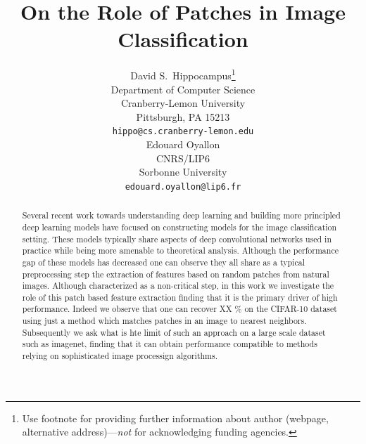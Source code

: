 \documentclass{article}
\title{On the Role of Patches in \Edouard{ Analysis of}  Image Classification \Edouard{models}}
\author{%
  David S.~Hippocampus\thanks{Use footnote for providing further information
    about author (webpage, alternative address)---\emph{not} for acknowledging
    funding agencies.} \\
  Department of Computer Science\\
  Cranberry-Lemon University\\
  Pittsburgh, PA 15213 \\
  \texttt{hippo@cs.cranberry-lemon.edu} \\
  \And
  Edouard Oyallon \\
  CNRS/LIP6 \\
  Sorbonne University \\
  \texttt{edouard.oyallon@lip6.fr} \\
}
\newcommand{\Edouard}[1]{\textcolor{blue}{#1}}
\begin{document}
\maketitle

\begin{abstract}
  
  Several recent work towards understanding deep learning and building more principled deep learning models have focused on constructing models for the image classification setting. These models typically share aspects of deep convolutional networks used in practice while being more amenable to theoretical analysis. Although the performance gap of these models has decreased one can observe they all share as a typical preprocessing step the extraction of features based on random patches from natural images. Although characterized as a non-critical step, in this work we investigate the role of this patch based feature extraction finding that it is the primary driver of high performance. Indeed we observe that one can recover XX \% on the CIFAR-10 dataset using just a method which matches patches in an image to nearest neighbors. Subsequently we ask what is hte limit of such an approach on a large scale dataset such as imagenet, finding that it can obtain performance compatible to methods relying on sophisticated image processign algorithms. \\
  
  
\end{abstract}
\end{document}
